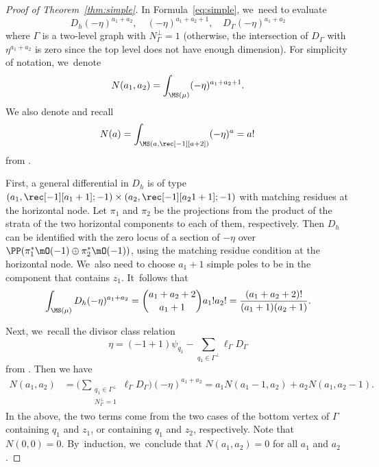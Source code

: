 \begin{proof}[Proof of Theorem~\ref{thm:simple}]
In Formula~\eqref{eq:simple}, we~need to evaluate
\[
D_h (-\eta)^{a_1+a_2}, \quad (-\eta)^{a_1+a_2+1},\quad D_\Gamma (-\eta)^{a_1+a_2}
\]
where $\Gamma$ is a two-level graph with $N_\Gamma^{\bot} = 1$ (otherwise, the intersection of $D_\Gamma$ with $\eta^{a_1+a_2}$ is zero since the top level does not have enough dimension). For simplicity of notation, we~denote
\[
N(a_1, a_2) = \int_{\MS(\mu)} (-\eta)^{a_1+a_2+1}.
\]
We also denote and recall
\[
N(a) = \int_{\MS(a, \rec[-1][a+2])} (-\eta)^{a} = a! \,
\]
from \cite{ChPrIso}.

First, a general differential in $D_h$ is of type $(a_1,\rec[-1][a_1+1]; -1)\times (a_2, \rec[-1][a_21+1]; -1)$ with matching residues at the horizontal node. Let $\pi_1$ and $\pi_2$ be the projections from the product of the strata of the two horizontal components to each of them, respectively. Then $D_h$ can be identified with the zero locus of a section of $-\eta$ over $\PP(\pi_1^{*}\mO(-1) \oplus \pi_2^{*}\mO(-1))$, using the matching residue condition at the horizontal node. We~also need to choose $a_1+1$ simple poles to be in the component that contains $z_1$. It~follows that
\begin{align*}
\int_{\MS(\mu)}D_h (-\eta)^{a_1+a_2} = \binom{a_1 + a_2 + 2 }{a_1 + 1} a_1 ! a_2 !  = \frac{(a_1+a_2+2)!}{(a_1+1)(a_2+1)}.
\end{align*}

Next, we~recall the divisor class relation
\[
\eta = (-1+1) \psi_{q_1} -\sum_{q_1\in \Gamma^\bot} \ell_\Gamma D_\Gamma
\]
from \cite[Prop.\,8.2]{CMZ}.
Then we have
\begin{align*}
N (a_1, a_2) & = \biggl( \sum_{\substack{q_1\in \Gamma^\bot\\ N_\Gamma^{\bot} = 1}} \ell_\Gamma D_\Gamma \biggr) (-\eta)^{a_1+a_2} = a_1 N(a_1-1, a_2) + a_2 N(a_1, a_2-1).
\end{align*}
In the above, the two terms come from the two cases of the bottom vertex of $\Gamma$ containing $q_1$ and $z_1$, or containing $q_1$ and $z_2$, respectively. Note that $N(0,0) = 0$. By~induction, we~conclude that $N(a_1, a_2) = 0$ for all $a_1$ and $a_2$.


\end{proof}
